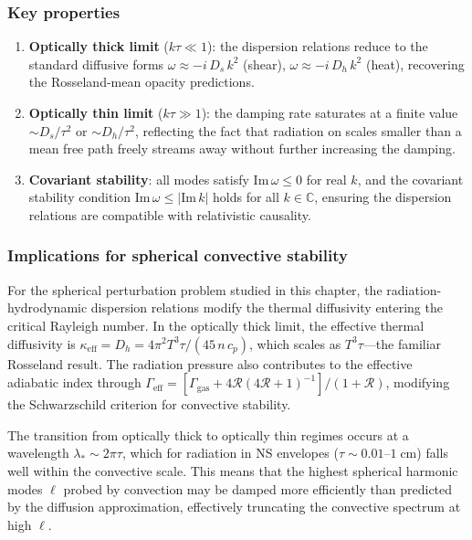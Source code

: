 \subsubsection{Key properties}
\begin{enumerate}
  \item \textbf{Optically thick limit} ($k\tau \ll 1$): the dispersion
    relations reduce to the standard diffusive forms
    $\omega \approx -i\,D_s\,k^2$ (shear), $\omega \approx -i\,D_h\,k^2$
    (heat), recovering the Rosseland-mean opacity predictions.
  \item \textbf{Optically thin limit} ($k\tau \gg 1$): the damping rate
    saturates at a finite value $\sim D_s/\tau^2$ or $\sim D_h/\tau^2$,
    reflecting the fact that radiation on scales smaller than a mean free
    path freely streams away without further increasing the damping.
  \item \textbf{Covariant stability}: all modes satisfy
    $\mathrm{Im}\,\omega \le 0$ for real $k$, and the covariant
    stability condition $\mathrm{Im}\,\omega \le |\mathrm{Im}\,k|$
    holds for all $k \in \mathbb{C}$, ensuring the dispersion relations
    are compatible with relativistic causality.
\end{enumerate}

\subsubsection{Implications for spherical convective stability}
For the spherical perturbation problem studied in this chapter, the
radiation-hydrodynamic dispersion relations modify the thermal
diffusivity entering the critical Rayleigh number.  In the optically
thick limit, the effective thermal diffusivity is
$\kappa_{\text{eff}} = D_h = 4\pi^2 T^3 \tau/(45\,n\,c_p)$, which
scales as $T^3\tau$---the familiar Rosseland result.  The radiation
pressure also contributes to the effective adiabatic index through
$\Gamma_{\text{eff}} = [\Gamma_{\text{gas}} + 4\mathcal{R}(4\mathcal{R}+1)^{-1}]/(1+\mathcal{R})$,
modifying the Schwarzschild criterion for convective stability.

The transition from optically thick to optically thin regimes occurs
at a wavelength $\lambda_* \sim 2\pi\tau$, which for radiation in
NS envelopes ($\tau \sim 0.01$--$1\;\mathrm{cm}$) falls well within
the convective scale.  This means that the highest spherical harmonic
modes $\ell$ probed by convection may be damped more efficiently than
predicted by the diffusion approximation, effectively truncating the
convective spectrum at high $\ell$.

